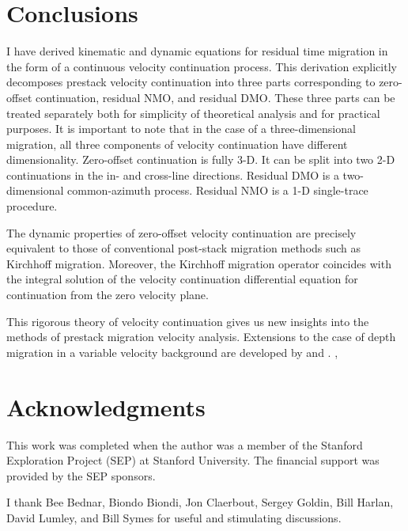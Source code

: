 \section{Conclusions}
I have derived kinematic and dynamic equations for residual time migration
in the form of a continuous velocity continuation process. This
derivation explicitly decomposes prestack
velocity continuation into three parts corresponding to
zero-offset continuation, residual NMO, and residual DMO. These three
parts can be treated separately both for simplicity of theoretical
analysis and for practical purposes. It is important to note that in
the case of a three-dimensional migration, all three components of
velocity continuation have different dimensionality. Zero-offset
continuation is fully 3-D. It can be split into two 2-D continuations
in the in- and cross-line directions. Residual DMO is a
two-dimensional common-azimuth process. Residual NMO is a 1-D
single-trace procedure.

The dynamic properties of zero-offset velocity continuation are
precisely equivalent to those of conventional post-stack migration
methods such as Kirchhoff migration. Moreover, the Kirchhoff migration
operator coincides with the integral solution of the velocity
continuation differential equation for continuation from the zero
velocity plane.

This rigorous theory of velocity continuation gives us new insights into the
methods of prestack migration velocity analysis. Extensions to the case of
depth migration in a variable velocity background are developed by
\cite{hong} and \cite{adler}.  \cite[]{second}, 

\section{Acknowledgments}
This work was completed when the author was a member of the Stanford
Exploration Project (SEP) at Stanford University. The financial
support was provided by the SEP sponsors.

I thank Bee Bednar, Biondo Biondi, Jon Claerbout, Sergey Goldin, Bill Harlan,
David Lumley, and Bill Symes for useful and stimulating discussions.

